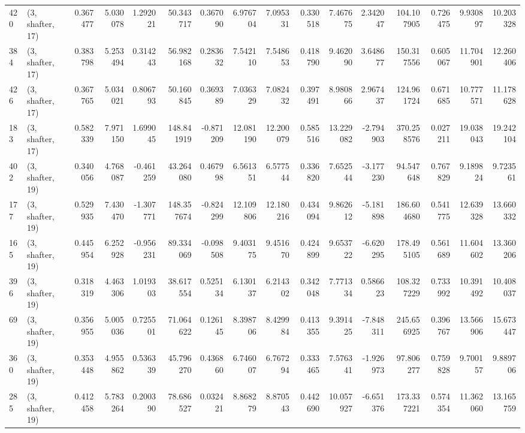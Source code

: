 \begin{tabular}{llrrrrrrrrrrrrrr}
420 &  (3, shafter, 17) &   0.367477 &   5.030078 &   1.292021 &    50.343717 &   0.367090 &   6.976704 &   7.095331 &  0.330518 &   7.467675 &   2.342047 &   104.107905 &  0.726475 &   9.930897 &  10.203328 \\
384 &  (3, shafter, 17) &   0.383798 &   5.253494 &   0.314243 &    56.982168 &   0.283632 &   7.542110 &   7.548653 &  0.418790 &   9.462090 &   3.648677 &   150.317556 &  0.605067 &  11.704901 &  12.260406 \\
426 &  (3, shafter, 17) &   0.367765 &   5.034021 &   0.806793 &    50.160845 &   0.369389 &   7.036329 &   7.082432 &  0.397491 &   8.980866 &   2.967437 &   124.961724 &  0.671685 &  10.777571 &  11.178628 \\
183 &  (3, shafter, 17) &   0.582339 &   7.971150 &   1.699045 &   148.841919 &  -0.871209 &  12.081190 &  12.200079 &  0.585516 &  13.229082 &  -2.794903 &   370.258576 &  0.027211 &  19.038043 &  19.242104 \\
402 &  (3, shafter, 19) &   0.340056 &   4.768087 &  -0.461259 &    43.264080 &   0.467998 &   6.561351 &   6.577544 &  0.336820 &   7.652544 &  -3.177230 &    94.547648 &  0.767829 &   9.189824 &   9.723561 \\
177 &  (3, shafter, 19) &   0.529935 &   7.430470 &  -1.307771 &   148.357674 &  -0.824299 &  12.109806 &  12.180216 &  0.434094 &   9.862612 &  -5.181898 &   186.604680 &  0.541775 &  12.639328 &  13.660332 \\
165 &  (3, shafter, 19) &   0.445954 &   6.252928 &  -0.956231 &    89.334069 &  -0.098508 &   9.403175 &   9.451670 &  0.424899 &   9.653722 &  -6.620295 &   178.495105 &  0.561689 &  11.604602 &  13.360206 \\
396 &  (3, shafter, 19) &   0.318319 &   4.463306 &   1.019303 &    38.617554 &   0.525134 &   6.130137 &   6.214302 &  0.342048 &   7.771334 &   0.586623 &   108.327229 &  0.733992 &  10.391492 &  10.408037 \\
69  &  (3, shafter, 19) &   0.356955 &   5.005036 &   0.725501 &    71.064622 &   0.126145 &   8.398706 &   8.429984 &  0.413355 &   9.391425 &  -7.848311 &   245.656925 &  0.396767 &  13.566906 &  15.673447 \\
360 &  (3, shafter, 19) &   0.353448 &   4.955862 &   0.536339 &    45.796270 &   0.436860 &   6.746007 &   6.767294 &  0.333465 &   7.576341 &  -1.926973 &    97.806277 &  0.759828 &   9.700157 &   9.889706 \\
285 &  (3, shafter, 19) &   0.412458 &   5.783264 &   0.200390 &    78.686527 &   0.032421 &   8.868279 &   8.870543 &  0.442690 &  10.057927 &  -6.651376 &   173.337221 &  0.574354 &  11.362060 &  13.165759 \\

\end{tabular}
